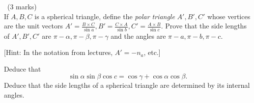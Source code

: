 \documentclass[12pt]{article}
\begin{document}
\vspace{1cm}

\begin{question}\ (3 marks)\\
  If $A,B,C$ is a spherical triangle, define the {\em polar triangle} $A',B',C'$ whose vertices are the unit vectors $A'=\frac{B\times C}{\sin a},B'=\frac{C\times A}{\sin b},C'=\frac{A\times B}{\sin c}$. Prove that the side lengths of $A',B',C'$ are $\pi-\alpha,\pi-\beta,\pi-\gamma$ and the angles are $\pi-a,\pi-b,\pi-c$.

  [Hint: In the notation from lectures, $A'=-n_a$, etc.]
  
  Deduce that
  \[\sin\alpha\sin\beta\cos c=\cos\gamma+\cos\alpha\cos\beta.\]
  Deduce that the side lengths of a spherical triangle are determined by its internal angles.
\end{question}

\iffalse
\begin{answer}
  Recall that if $ABC$ is a spherical triangle then its side lengths $a,b,c$ satisfy
  \begin{align*}
    \cos a&=B\cdot C\\
    \cos b&=C\cdot A\\
    \cos c&=A\cdot B
  \end{align*}
  and its internal angles satisfy
  \begin{align*}
    -\cos\alpha&=n_b\cdot n_c\\
    -\cos\beta&=n_c\cdot n_a\\
    -\cos\gamma&=n_a\cdot n_b
  \end{align*}
  where $n_a=-A'$, $n_b=-B'$, $n_c=-C'$ for the polar triangle $A',B',C'$. Therefore $\cos a'=-\cos\alpha$, $\cos a=-\cos\alpha'$, etc. so $\alpha'=\pi-a$, $a'=\pi-\alpha$, etc. Applying the cosine rule to the polar triangle therefore gives
  \[\sin(\pi-\alpha)\sin(\pi-\beta)\cos(\pi-c)=\cos(\pi-\gamma)-\cos(\pi-\alpha)\cos(\pi-\beta)\]
  or, since $\sin(\pi-x)=\sin x$, $\cos(\pi-x)=-\cos x$,
  \[\sin\alpha\sin\beta\cos c=\cos\gamma+\cos\alpha\cos\beta\mbox{, etc.}\]
  This tells us that $\alpha,\beta,\gamma$ determine $a,b,c$.
\end{answer}
\newpage
\fi
\end{document}
